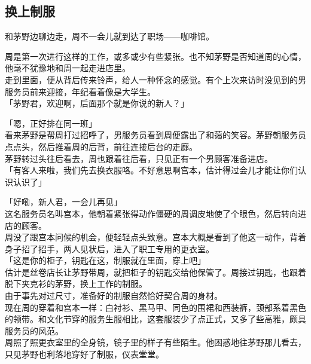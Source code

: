 \subsection{换上制服}

和茅野边聊边走，周不一会儿就到达了职场——咖啡馆。

周是第一次进行这样的工作，或多或少有些紧张。也不知茅野是否知道周的心情，他毫不犹豫地和周一起走进店里。\\

走到里面，便从背后传来铃声，给人一种怀念的感觉。有个上次来访时没见到的男服务员前来迎接，年纪看着像是大学生。\\

「茅野君，欢迎啊，后面那个就是你说的新人？」

「嗯，正好排在同一班」\\

看来茅野是帮周打过招呼了，男服务员看到周便露出了和蔼的笑容。茅野朝服务员点点头，然后推着周的后背，前往连接后台的走廊。\\

茅野转过头往后看去，周也跟着往后看，只见正有一个男顾客准备进店。\\

「有客人来啦，我们先去换衣服咯。不好意思啊宫本，估计得过会儿才能让你们认识认识了」

「好嘞，新人君，一会儿再见」\\

这名服务员名叫宫本，他朝着紧张得动作僵硬的周调皮地使了个眼色，然后转向进店的顾客。\\

周没了跟宫本问候的机会，便轻轻点头致意。宫本大概是看到了他这一动作，背着身子招了招手，两人见状后，进入了职工专用的更衣室。\\

「这是你的柜子，钥匙在这，制服就在里面，穿上吧」\\

估计是丝卷店长让茅野带周，就把柜子的钥匙交给他保管了。周接过钥匙，也跟着脱下夹克衫的茅野，换上工作的制服。\\

由于事先对过尺寸，准备好的制服自然恰好契合周的身材。\\

现在周的穿着和宫本一样：白衬衫、黑马甲、同色的围裙和西装裤，颈部系着黑色的领带。和文化节穿的服务生服相比，这套服装少了点正式，又多了些高雅，颇具服务员的风范。\\

周照了照更衣室里的全身镜，镜子里的样子有些陌生。他困惑地往茅野那儿看去，只见茅野也利落地穿好了制服，仪表堂堂。\\

